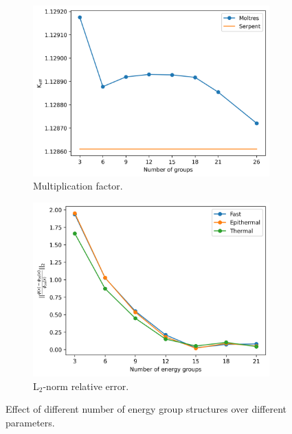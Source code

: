 \documentclass[11pt,letterpaper]{article}
\begin{document}
\begin{figure}[htbp!]
	\centering
	\begin{subfigure}[t]{0.4\textwidth}
		\centering
		\includegraphics[width=\linewidth]{figures/keff-LBP-600}
		\caption{Multiplication factor.}
	\end{subfigure}
	\begin{subfigure}[t]{0.4\textwidth}
		\centering
		\includegraphics[width=\linewidth]{figures/LBP-600-er-final}
		\caption{L$_2$-norm relative error.}
	\end{subfigure}
	\hfill
	\caption{Effect of different number of energy group structures over different parameters.}
	\label{fig:assembly-LBP-600}
\end{figure}
\end{document}
